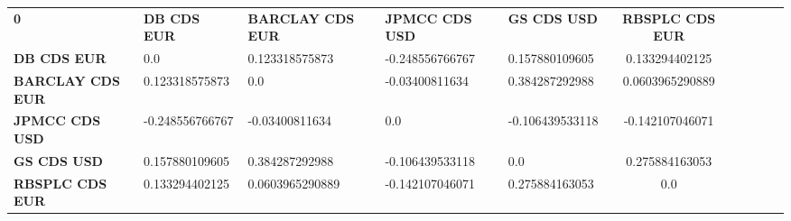 \begin{center}
 \begin{tabular}{|l|l|l|l|l|c|c|c|c|c|}
\hline
\textbf{0} & \textbf{DB CDS EUR} & \textbf{BARCLAY CDS EUR} & \textbf{JPMCC CDS USD} & \textbf{GS CDS USD} & \textbf{RBSPLC CDS EUR}\\\hhline{|=|=|=|=|=|=|}
\textbf{DB CDS EUR} & 0.0 & 0.123318575873 & -0.248556766767 & 0.157880109605 & 0.133294402125\\
\textbf{BARCLAY CDS EUR} & 0.123318575873 & 0.0 & -0.03400811634 & 0.384287292988 & 0.0603965290889\\
\textbf{JPMCC CDS USD} & -0.248556766767 & -0.03400811634 & 0.0 & -0.106439533118 & -0.142107046071\\
\textbf{GS CDS USD} & 0.157880109605 & 0.384287292988 & -0.106439533118 & 0.0 & 0.275884163053\\
\textbf{RBSPLC CDS EUR} & 0.133294402125 & 0.0603965290889 & -0.142107046071 & 0.275884163053 & 0.0\\
\hline
\end{tabular}
\end{center}